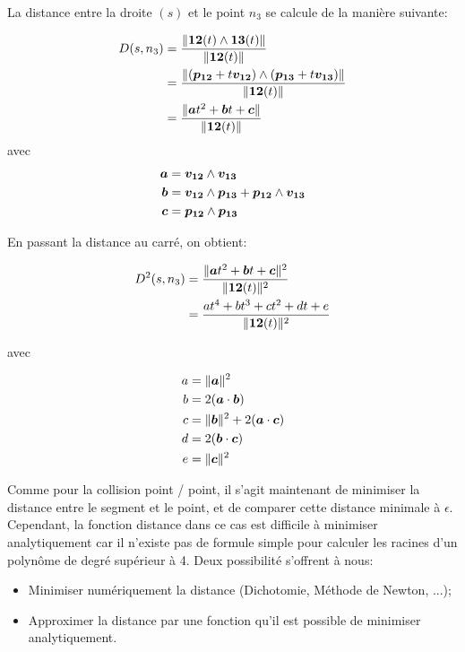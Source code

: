 \documentclass[11pt,class=article,float=false,crop=false]{standalone}
\begin{document}
La distance entre la droite $(s)$ et le point $n_3$ se calcule de la manière suivante: 

\begin{align}
	D(s,n_3) & = \frac{\|\bm{12}(t) \wedge \bm{13}(t)\|}
	{\|\bm{12}(t)\|} \\
	& = \frac{\|(\bm{p_{12}} + t\bm{v_{12}}) \wedge (\bm{p_{13}} + t\bm{v_{13}})\|}
	{\|\bm{12}(t)\|} \\
	& = \frac{\|\bm{a}t^2 + \bm{b}t + \bm{c}\|}
	{\|\bm{12}(t)\|}
\end{align}
avec 
\begin{align}
	\bm{a} &= \bm{v_{12}} \wedge \bm{v_{13}}\\
	\bm{b} &= \bm{v_{12}} \wedge \bm{p_{13}}+ \bm{p_{12}} \wedge \bm{v_{13}}\\
	\bm{c} &= \bm{p_{12}} \wedge \bm{p_{13}}
\end{align}

En passant la distance au carré, on obtient:

\begin{align}
	D^2(s,n_3) & = \frac{\|\bm{a}t^2 + \bm{b}t + \bm{c}\|^2}
	{\|\bm{12}(t)\|^2} \\
	& =  \frac{at^4 + bt^3 + ct^2 + dt + e}
	{\|\bm{12}(t)\|^2} 
\end{align}

avec 

\begin{align}
	a &= \|\bm{a}\|^2\\
	b &= 2(\bm{a} \cdot \bm{b})\\
	c &= \|\bm{b}\|^2 + 2(\bm{a} \cdot \bm{c})\\
	d &= 2(\bm{b} \cdot \bm{c})\\
	e &= \|\bm{c}\|^2
\end{align}

Comme pour la collision point / point, il s'agit maintenant de minimiser la distance entre le segment et le point, et de comparer cette distance minimale à $\epsilon$. Cependant, la fonction distance dans ce cas est difficile à minimiser analytiquement car il n'existe pas de formule simple pour calculer les racines d'un polynôme de degré supérieur à 4. Deux possibilité s'offrent à nous: 

\begin{itemize}
	\item Minimiser numériquement la distance (Dichotomie, Méthode de Newton, ...);
	\item Approximer la distance par une fonction qu'il est possible de minimiser analytiquement. 
\end{itemize}
\end{document}
